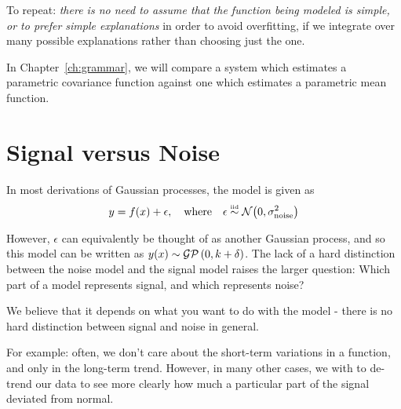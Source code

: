 To repeat: \emph{there is no need to assume that the function being modeled is simple, or to prefer simple explanations} in order to avoid overfitting, if we integrate over many possible explanations rather than choosing just the one.

In Chapter~\ref{ch:grammar}, we will compare a system which estimates a parametric covariance function against one which estimates a parametric mean function.


\section{Signal versus Noise}

In most derivations of Gaussian processes, the model is given as
%
\begin{align}
y = f(x) + \epsilon, \quad \textnormal{where} \quad \epsilon \overset{\mbox{\tiny iid}}{\sim} \mathcal{N}\!\left(0,\sigma^2_{\textnormal{noise}}\right)
\end{align}

However, $\epsilon$ can equivalently be thought of as another Gaussian process, and so this model can be written as $y(x) \sim \mathcal{GP}\left(0, k + \delta \right)$.  The lack of a hard distinction between the noise model and the signal model raises the larger question:  Which part of a model represents signal, and which represents noise?

We believe that it depends on what you want to do with the model - there is no hard distinction between signal and noise in general.

For example: often, we don't care about the short-term variations in a function, and only in the long-term trend.
However, in many other cases, we with to de-trend our data to see more clearly how much a particular part of the signal deviated from normal.


\fi






